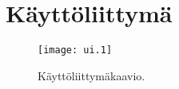 \documentclass[a4paper,12pt]{report}
\begin{document}

\section{Käyttöliittymä}
\begin{figure}[ht]
   \centering \texttt{[image: ui.1]}
   \caption{Käyttöliittymäkaavio.
   }
   \label{graph_ui}
\end{figure}




\end{document}
